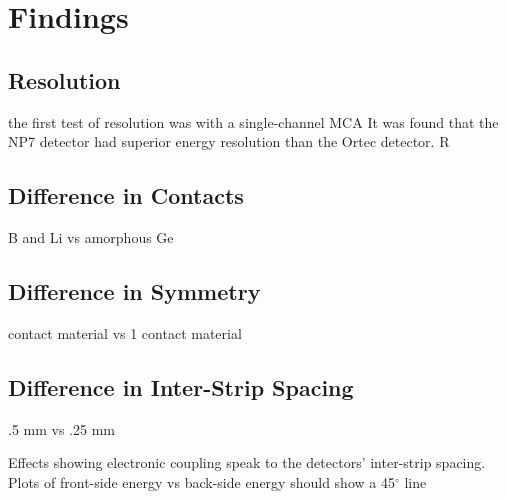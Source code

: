 \chapter{Findings}
\label{ch:Findings}

\section{Resolution}
\indent the first test of resolution was with a single-channel MCA
It was found that the NP7 detector had superior energy resolution than the Ortec detector. R

\section{Difference in Contacts}
\indent B and Li vs amorphous Ge

\section{Difference in Symmetry}
 contact material vs 1 contact material

\section{Difference in Inter-Strip Spacing}
\indent .5 mm vs .25 mm

Effects showing electronic coupling speak to the detectors' inter-strip spacing. Plots of front-side energy vs back-side energy should show a 45$^{\circ}$ line 




 


 